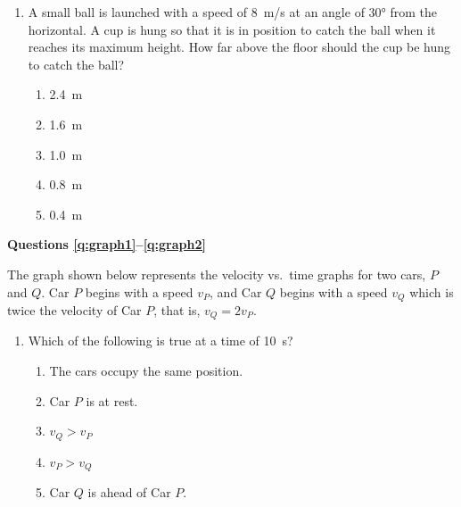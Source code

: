 \documentclass{../../../oss-apphys}
\begin{document}
\begin{multicols}{2}
\begin{enumerate}[resume,leftmargin=18pt]
    \columnbreak
    
  \item A small ball is launched with a speed of \SI{8}{m/s} at an angle of
    \ang{30} from the horizontal. A cup is hung so that it is in position to
    catch the ball when it reaches its maximum height. How far above the floor
    should the cup be hung to catch the ball?
    

    \begin{enumerate}[noitemsep,topsep=0pt,leftmargin=18pt,label=(\Alph*)]
    \item\SI{2.4}{\metre}
    \item\SI{1.6}{\metre}
    \item\SI{1.0}{\metre}
    \item\SI{.8}{\metre}
    \item\SI{.4}{\metre}
    \end{enumerate}
  \end{enumerate}
  
  \textbf{Questions \ref{q:graph1}--\ref{q:graph2}}

  The graph shown below represents the velocity vs.\ time graphs for two cars,
  $P$ and $Q$. Car $P$ begins with a speed $v_P$, and Car $Q$ begins with a
  speed $v_Q$ which is twice the velocity of Car $P$, that is, $v_Q=2v_P$.
  \begin{center}
  \end{center}
  \begin{enumerate}[resume,leftmargin=18pt]
  \item Which of the following is true at a time of \SI{10}{\second}?
    \begin{enumerate}[noitemsep,topsep=0pt,leftmargin=18pt,label=(\Alph*)]
    \item The cars occupy the same position.
    \item Car $P$ is at rest.
    \item $v_Q>v_P$
    \item $v_P>v_Q$
    \item Car $Q$ is ahead of Car $P$.
    \end{enumerate}
    \label{q:graph1}
    

\end{enumerate}
\end{multicols}
\end{document}
